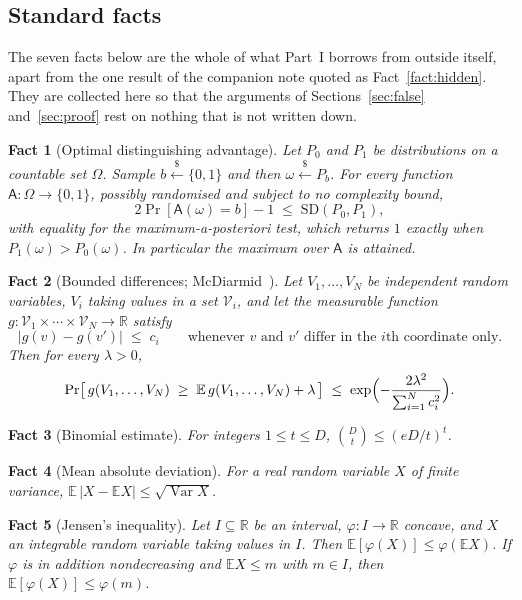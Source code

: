 \documentclass{aicr-solution}
\renewcommand{\sample}{\stackrel{{\scriptscriptstyle\$}}{\leftarrow}}
\newcommand{\SD}{\mathrm{SD}}
\newtheorem{fact}{Fact}
\begin{document}
\subsection{Standard facts}\label{sec:facts}

The seven facts below are the whole of what Part~I borrows from outside itself, apart from the
one result of the companion note quoted as Fact~\ref{fact:hidden}. They are collected here so
that the arguments of Sections~\ref{sec:false} and~\ref{sec:proof} rest on nothing that is not
written down.

\begin{fact}[Optimal distinguishing advantage]\label{fact:sd}
Let $P_0$ and $P_1$ be distributions on a countable set $\Omega$. Sample $b \sample \{0,1\}$ and
then $\omega \sample P_b$. For every function $\mathsf{A} \colon \Omega \to \{0,1\}$, possibly
randomised and subject to no complexity bound,
\[
  2\Pr[\mathsf{A}(\omega) = b] - 1 \;\le\; \SD(P_0,P_1) ,
\]
with equality for the maximum-a-posteriori test, which returns $1$ exactly when
$P_1(\omega) > P_0(\omega)$. In particular the maximum over $\mathsf{A}$ is attained.
\end{fact}

\begin{fact}[Bounded differences; McDiarmid~\cite{McD89}]\label{fact:mcd}
Let $V_1, \dots, V_N$ be independent random variables, $V_i$ taking values in a set
$\mathcal{V}_i$, and let the measurable function
$g \colon \mathcal{V}_1 \times \cdots \times \mathcal{V}_N \to \mathbb{R}$ satisfy
\[
  |g(v) - g(v')| \;\le\; c_i
  \qquad\text{whenever $v$ and $v'$ differ in the $i$th coordinate only.}
\]
Then for every $\lambda > 0$,
\[
  \Pr\bigl[\, g(V_1,\dots,V_N) \;\ge\; \mathbb{E}\,g(V_1,\dots,V_N) + \lambda \,\bigr]
  \;\le\; \exp\Bigl(-\frac{2\lambda^{2}}{\sum_{i=1}^{N} c_i^{2}}\Bigr) .
\]
\end{fact}

\begin{fact}[Binomial estimate]\label{fact:binom}
For integers $1 \le t \le D$, \; $\binom{D}{t} \le (eD/t)^{t}$.
\end{fact}

\begin{fact}[Mean absolute deviation]\label{fact:mad}
For a real random variable $X$ of finite variance,
$\mathbb{E}\,|X - \mathbb{E}X| \le \sqrt{\operatorname{Var} X}$.
\end{fact}

\begin{fact}[Jensen's inequality]\label{fact:jensen}
Let $I \subseteq \mathbb{R}$ be an interval, $\varphi \colon I \to \mathbb{R}$ concave, and $X$
an integrable random variable taking values in $I$. Then
$\mathbb{E}[\varphi(X)] \le \varphi(\mathbb{E}X)$. If $\varphi$ is in addition nondecreasing and
$\mathbb{E}X \le m$ with $m \in I$, then $\mathbb{E}[\varphi(X)] \le \varphi(m)$.
\end{fact}
\end{document}
